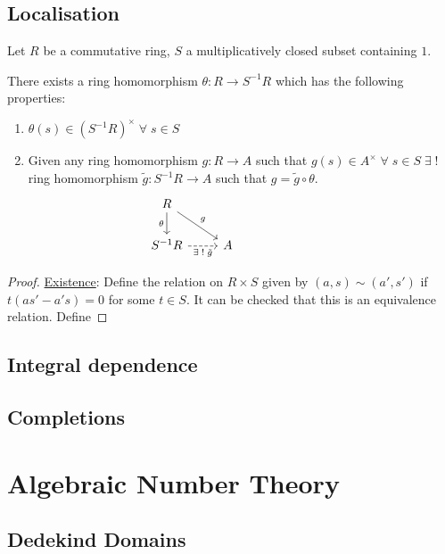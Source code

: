 \documentclass[oneside, 12pt, ]{scrbook}
\theoremstyle{theorem}
\begin{document}
\chapter{Localisation}
Let $R$ be a commutative ring, $S$ a multiplicatively closed subset containing $1$.
\begin{theorem}
There exists a ring homomorphism $\theta : R \rightarrow S^{-1}R$ which has the following properties: 
\begin{enumerate}
\item $\theta(s) \in (S^{-1}R)^{\times} \; \forall \; s\in S$
\item Given any ring homomorphism $g: R \rightarrow A$ such that $g(s) \in A^{\times} \; \forall \; s \in S \; \exists \; ! \;$ ring homomorphism $\tilde{g}: S^{-1}R \rightarrow A$ such that $g = \tilde{g} \circ \theta$.
\[\begin{tikzcd}
	R &&&& {} \\
	{S^{-1}R} & A
	\arrow["\theta"', from=1-1, to=2-1]
	\arrow["g", from=1-1, to=2-2]
	\arrow["{\exists \;!\; \tilde{g}}"', dashed, from=2-1, to=2-2]
\end{tikzcd}\]
\end{enumerate}
\end{theorem}

\begin{proof}
\underline{Existence}: Define the relation on $R \times S$ given by $(a,s) \sim (a',s') $ if $t(as' - a's) =0$ for some $t \in S$. It can be checked that this is an equivalence relation. Define  
\end{proof}


\chapter{Integral dependence}

\chapter{Completions}





\part{Algebraic Number Theory}

\chapter{Dedekind Domains}
\end{document}
